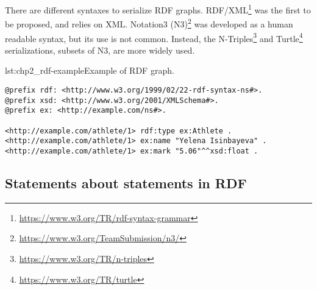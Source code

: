 There are different syntaxes to serialize RDF graphs. RDF/XML\footnote{\url{https://www.w3.org/TR/rdf-syntax-grammar}} was the first to be proposed, and relies on XML. Notation3 (N3)\footnote{\url{https://www.w3.org/TeamSubmission/n3/}} was developed as a human readable syntax, but its use is not common. Instead, the N-Triples\footnote{\url{https://www.w3.org/TR/n-triples}} and Turtle\footnote{\url{https://www.w3.org/TR/turtle}} serializations, subsets of N3, are more widely used. 

\begin{minipage}{\textwidth}
\begin{captionedlisting}{lst:chp2_rdf-example}{Example of RDF graph.}
\centering
{\begin{lstlisting}[language=r2rml]
@prefix rdf: <http://www.w3.org/1999/02/22-rdf-syntax-ns#>.
@prefix xsd: <http://www.w3.org/2001/XMLSchema#>.
@prefix ex: <http://example.com/ns#>.

<http://example.com/athlete/1> rdf:type ex:Athlete .
<http://example.com/athlete/1> ex:name "Yelena Isinbayeva" .
<http://example.com/athlete/1> ex:mark "5.06"^^xsd:float .
\end{lstlisting}}
\end{captionedlisting}
\end{minipage}

\subsection{Statements about statements in RDF}

